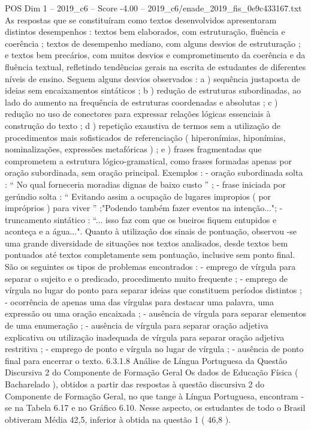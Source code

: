 \begin{textsample}{POS Dim 1 – 2019\_c6 – Score -4.00 – 2019\_c6/enade\_2019\_fis\_0e9c433167.txt}
As respostas que se constituíram como textos desenvolvidos apresentaram distintos desempenhos : textos bem elaborados, com estruturação, fluência e coerência ; textos de desempenho mediano, com alguns desvios de estruturação ; e textos bem precários, com muitos desvios e comprometimento da coerência e da fluência textual, refletindo tendências gerais na escrita de estudantes de diferentes níveis de ensino.
Seguem alguns desvios observados : a ) sequência justaposta de ideias sem encaixamentos sintáticos ; b ) redução de estruturas subordinadas, ao lado do aumento na frequência de estruturas coordenadas e absolutas ; c ) redução no uso de conectores para expressar relações lógicas essenciais à construção do texto ; d ) repetição exaustiva de termos sem a utilização de procedimentos mais sofisticados de referenciação ( hiperonímias, hiponímias, nominalizações, expressões metafóricas ) ; e ) frases fragmentadas que comprometem a estrutura lógico-gramatical, como frases formadas apenas por oração subordinada, sem oração principal.
Exemplos : - oração subordinada solta : “ No qual forneceria moradias dignas de baixo custo ” ; - frase iniciada por gerúndio solta : “ Evitando assim a ocupação de lugares impropios ( por impróprios ) para viver ” ;"Podendo também fazer eventos na intenção..."; - truncamento sintático : “... isso faz com que os bueiros fiquem entupidos e aconteça e a água...".
Quanto à utilização dos sinais de pontuação, observou -se uma grande diversidade de situações nos textos analisados, desde textos bem pontuados até textos completamente sem pontuação, inclusive sem ponto final.
São os seguintes os tipos de problemas encontrados : - emprego de vírgula para separar o sujeito e o predicado, procedimento muito frequente ; - emprego de vírgula no lugar do ponto para separar ideias que constituem períodos distintos ; - ocorrência de apenas uma das vírgulas para destacar uma palavra, uma expressão ou uma oração encaixada ; - ausência de vírgula para separar elementos de uma enumeração ; - ausência de vírgula para separar oração adjetiva explicativa ou utilização inadequada de vírgula para separar oração adjetiva restritiva ; - emprego de ponto e vírgula no lugar de vírgula ; - ausência de ponto final para encerrar o texto. 6.3.1.8 Análise de Língua Portuguesa da Questão Discursiva 2 do Componente de Formação Geral Os dados de Educação Física ( Bacharelado ), obtidos a partir das respostas à questão discursiva 2 do Componente de Formação Geral, no que tange à Língua Portuguesa, encontram -se na Tabela 6.17 e no Gráfico 6.10.
Nesse aspecto, os estudantes de todo o Brasil obtiveram Média 42,5, inferior à obtida na questão 1 ( 46,8 ).

\end{textsample}
